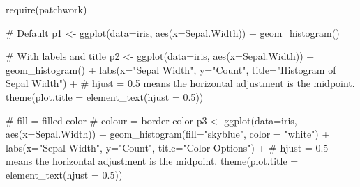 \documentclass[
  letterpaper,
  DIV=11,
  numbers=noendperiod]{scrreprt}
\newenvironment{Shaded}{\begin{snugshade}}{\end{snugshade}}
\newcommand{\AttributeTok}[1]{\textcolor[rgb]{0.40,0.45,0.13}{#1}}
\newcommand{\CommentTok}[1]{\textcolor[rgb]{0.37,0.37,0.37}{#1}}
\newcommand{\FloatTok}[1]{\textcolor[rgb]{0.68,0.00,0.00}{#1}}
\newcommand{\FunctionTok}[1]{\textcolor[rgb]{0.28,0.35,0.67}{#1}}
\newcommand{\NormalTok}[1]{\textcolor[rgb]{0.00,0.23,0.31}{#1}}
\newcommand{\OtherTok}[1]{\textcolor[rgb]{0.00,0.23,0.31}{#1}}
\newcommand{\SpecialCharTok}[1]{\textcolor[rgb]{0.37,0.37,0.37}{#1}}
\newcommand{\StringTok}[1]{\textcolor[rgb]{0.13,0.47,0.30}{#1}}
\begin{document}
\begin{Shaded}
\begin{Highlighting}[]
\FunctionTok{require}\NormalTok{(patchwork)}

\CommentTok{\# Default}
\NormalTok{p1 }\OtherTok{\textless{}{-}} \FunctionTok{ggplot}\NormalTok{(}\AttributeTok{data=}\NormalTok{iris, }\FunctionTok{aes}\NormalTok{(}\AttributeTok{x=}\NormalTok{Sepal.Width)) }\SpecialCharTok{+}
        \FunctionTok{geom\_histogram}\NormalTok{()}

\CommentTok{\# With labels and title}
\NormalTok{p2 }\OtherTok{\textless{}{-}} \FunctionTok{ggplot}\NormalTok{(}\AttributeTok{data=}\NormalTok{iris, }\FunctionTok{aes}\NormalTok{(}\AttributeTok{x=}\NormalTok{Sepal.Width)) }\SpecialCharTok{+}
        \FunctionTok{geom\_histogram}\NormalTok{() }\SpecialCharTok{+}
        \FunctionTok{labs}\NormalTok{(}\AttributeTok{x=}\StringTok{"Sepal Width"}\NormalTok{, }\AttributeTok{y=}\StringTok{"Count"}\NormalTok{, }\AttributeTok{title=}\StringTok{"Histogram of Sepal Width"}\NormalTok{) }\SpecialCharTok{+}
        \CommentTok{\# hjust = 0.5 means the horizontal adjustment is the midpoint.}
        \FunctionTok{theme}\NormalTok{(}\AttributeTok{plot.title =} \FunctionTok{element\_text}\NormalTok{(}\AttributeTok{hjust =} \FloatTok{0.5}\NormalTok{))}

\CommentTok{\# fill = filled color}
\CommentTok{\# colour = border color}
\NormalTok{p3 }\OtherTok{\textless{}{-}} \FunctionTok{ggplot}\NormalTok{(}\AttributeTok{data=}\NormalTok{iris, }\FunctionTok{aes}\NormalTok{(}\AttributeTok{x=}\NormalTok{Sepal.Width)) }\SpecialCharTok{+}
        \FunctionTok{geom\_histogram}\NormalTok{(}\AttributeTok{fill=}\StringTok{"skyblue"}\NormalTok{, }\AttributeTok{color =} \StringTok{"white"}\NormalTok{) }\SpecialCharTok{+}
        \FunctionTok{labs}\NormalTok{(}\AttributeTok{x=}\StringTok{"Sepal Width"}\NormalTok{, }\AttributeTok{y=}\StringTok{"Count"}\NormalTok{, }\AttributeTok{title=}\StringTok{"Color Options"}\NormalTok{) }\SpecialCharTok{+}
        \CommentTok{\# hjust = 0.5 means the horizontal adjustment is the midpoint.}
        \FunctionTok{theme}\NormalTok{(}\AttributeTok{plot.title =} \FunctionTok{element\_text}\NormalTok{(}\AttributeTok{hjust =} \FloatTok{0.5}\NormalTok{))}


\end{Highlighting}
\end{Shaded}
\end{document}
